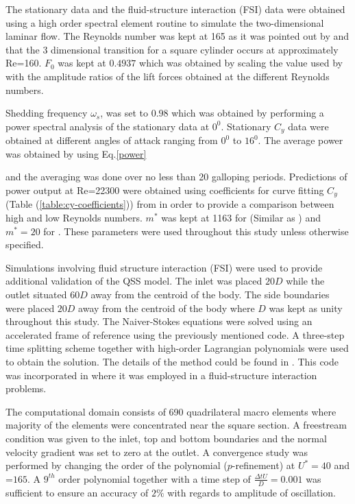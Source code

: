 The stationary data and the fluid-structure interaction (FSI) data were obtained using a high order spectral element routine to simulate the two-dimensional laminar flow. The Reynolds number was kept at 165 as it was pointed out by \cite{Sheard2009} and \cite{Tong2008} that the 3 dimensional transition for a square cylinder occurs at approximately Re=160. $F_0$ was kept at $0.4937$ which was obtained by scaling the value used by \cite{Joly2012} with the amplitude ratios of the lift forces obtained at the different Reynolds numbers. 



Shedding frequency $\omega_s$, was set to $0.98$ which was obtained by performing a power spectral analysis of the stationary data at $0^0$. Stationary $C_y$ data were obtained at different angles of attack ranging from $0^0$ to $16^0$. The average power was obtained by using Eq.\eqref{power} 



and the averaging was done over no less than 20 galloping periods. Predictions of power output at Re=22300 were obtained using coefficients for curve fitting $C_y$ (Table (\ref{table:cy-coefficients})) from \cite{Parkinson1964} in order to provide a comparison between high and low Reynolds numbers. $m^*$ was kept at 1163 for  (Similar as \cite{Parkinson1964}) and $m^*=20$ for . These parameters  were used throughout this study unless otherwise specified. 


 Simulations involving fluid structure interaction (FSI) were used to provide additional validation of the QSS model. The inlet was placed $20D$ while the outlet situated $60D$ away from the centroid of the body. The side boundaries were placed $20D$ away from the centroid of the body where $D$ was kept as unity throughout this study. The Naiver-Stokes equations were solved using an accelerated frame of reference using the previously mentioned code. A three-step time splitting scheme together with high-order Lagrangian polynomials were used to obtain the solution. The details of the method could be found in \cite{Thompson2006,Thompson1996a}. This code was incorporated in \cite{Leontini2011,Leontini2007a}  where it was employed in a fluid-structure interaction problems. 
 
 The computational domain consists of 690 quadrilateral macro elements where majority of the elements were concentrated near the square section. A freestream condition was given to the inlet, top and bottom boundaries and the normal velocity gradient was set to zero at the outlet. A convergence study was performed by changing the order of the polynomial ($p$-refinement) at $U^*=40$ and \reynoldsnumber=$165$. A $9^{th}$ order polynomial together with a time step of $\frac{\Delta tU}{D}=0.001$ was sufficient to ensure an accuracy of $2\%$ with regards to amplitude of oscillation.  
 

 
 
 

 
 
 
 









